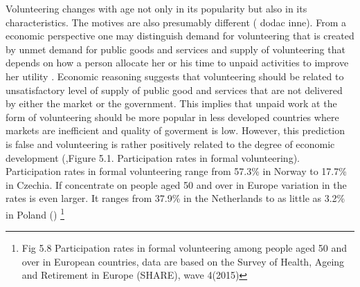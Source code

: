 \documentclass[10pt, letterpaper]{article}
\newcommand{\emd}[1]{\ExecuteMetaData[/tmp/tex]{#1}} %
\begin{document}
\begin{spacing}{1.4} %





Volunteering changes with age not only in its popularity but also in its characteristics. The motives are also presumably different (\citet{wilson12} dodac inne).  From a  economic perspective one may distinguish demand for volunteering that is created by unmet demand for public goods and services and supply of volunteering that depends on how  a person allocate her or his time to unpaid activities to improve her utility \citet{ziemek06}. Economic reasoning  suggests that volunteering should be related to unsatisfactory level of supply of public good and services  that are not delivered by either the market or the government. This implies that unpaid work at the form of volunteering should be more popular in less developed countries where markets are inefficient and quality of goverment is low. However, this prediction is false and volunteering is rather positively  related to the degree of economic development (\citet{Oecd15},Figure 5.1. Participation rates in formal volunteering). Participation rates in formal volunteering range from 57.3\% in Norway to 17.7\% in Czechia. If concentrate on people aged 50 and over in Europe variation in the rates is even larger. It ranges from 37.9\% in the Netherlands to as little as 3.2\% in Poland (\citet{Oecd15}) \footnote{Fig 5.8 Participation rates in formal volunteering among people aged 50 and over in European countries, data are based on the Survey of Health, Ageing and Retirement in Europe (SHARE), wave 4(2015)} \\ 


\end{spacing}
\end{document}
